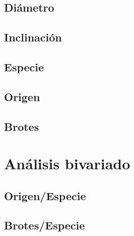 \documentclass[11pt]{article}
\begin{document}
\subsection{Diámetro}
\subsection{Inclinación}
\subsection{Especie}
\subsection{Origen}
\subsection{Brotes}

\section{Análisis bivariado}
\subsection{Origen/Especie}
\subsection{Brotes/Especie}
\end{document}
